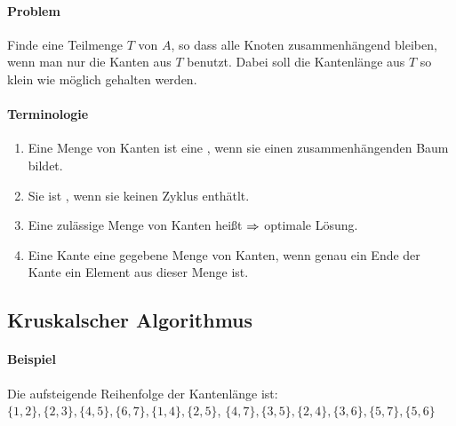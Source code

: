 \documentclass[a4paper,twoside,DIV15,BCOR12mm]{scrbook}
\begin{document}




\paragraph{Problem}
Finde eine Teilmenge $T$ von $A$, so dass alle Knoten zusammenhängend bleiben,
wenn man nur die Kanten aus $T$ benutzt. Dabei soll die Kantenlänge aus $T$ so
klein wie möglich gehalten werden. \\


\paragraph{Terminologie}
\begin{enumerate}
\item Eine Menge von Kanten ist eine , wenn sie einen zusammenhängenden
Baum bildet.
\item Sie ist , wenn sie keinen Zyklus enthätlt.
\item Eine zulässige Menge von Kanten heißt  $\Rightarrow$ optimale Lösung.
\item Eine Kante  eine gegebene Menge von Kanten, wenn genau ein Ende der
Kante ein Element aus dieser Menge ist.
\end{enumerate}

\subsection{Kruskalscher Algorithmus}
\paragraph{Beispiel}
Die aufsteigende Reihenfolge der Kantenlänge ist: \\
$\{1,2\},\{2,3\},\{4,5\},\{6,7\},\{1,4\},\{2,5\}$,
$\{4,7\},\{3,5\},\{2,4\},\{3,6\},\{5,7\},\{5,6\}$ \\ \\
\end{document}
